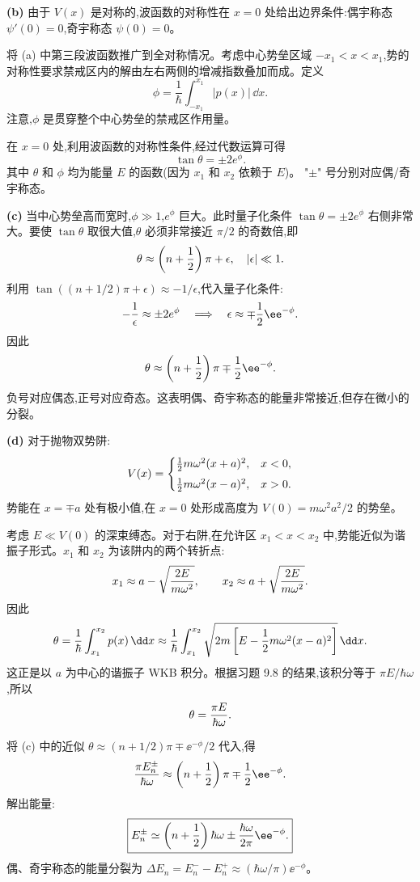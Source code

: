 \begin{question}
\begin{solution}
\textbf{(b)} 由于 $V(x)$ 是对称的,波函数的对称性在 $x=0$ 处给出边界条件:偶宇称态 $\psi'(0)=0$,奇宇称态 $\psi(0)=0$。

将 (a) 中第三段波函数推广到全对称情况。考虑中心势垒区域 $-x_1<x<x_1$,势的对称性要求禁戒区内的解由左右两侧的增减指数叠加而成。定义
\[
\phi=\frac{1}{\hbar}\int_{-x_1}^{x_1}|p(x)|\,\dd x.
\]
注意,$\phi$ 是贯穿整个中心势垒的禁戒区作用量。

在 $x=0$ 处,利用波函数的对称性条件,经过代数运算可得
\[
\boxed{\tan\theta=\pm2e^\phi.}
\]
其中 $\theta$ 和 $\phi$ 均为能量 $E$ 的函数(因为 $x_1$ 和 $x_2$ 依赖于 $E$)。 "$\pm$" 号分别对应偶/奇宇称态。

\textbf{(c)} 当中心势垒高而宽时,$\phi\gg1$,$e^\phi$ 巨大。此时量子化条件 $\tan\theta=\pm2e^\phi$ 右侧非常大。要使 $\tan\theta$ 取很大值,$\theta$ 必须非常接近 $\pi/2$ 的奇数倍,即
\[
\theta\approx\left(n+{1\over2}\right)\pi+\epsilon,\quad |\epsilon|\ll1.
\]
利用 $\tan\left((n+1/2)\pi+\epsilon\right)\approx-1/\epsilon$,代入量子化条件:
\[
-{1\over\epsilon}\approx\pm2e^\phi\quad\Longrightarrow\quad
\epsilon\approx\mp{1\over2}\ee^{-\phi}.
\]
因此
\[
\theta\approx\left(n+{1\over2}\right)\pi\mp{1\over2}\ee^{-\phi}.
\]
负号对应偶态,正号对应奇态。这表明偶、奇宇称态的能量非常接近,但存在微小的分裂。

\textbf{(d)} 对于抛物双势阱:
\[
V(x)=\begin{cases}
{1\over2}m\omega^2(x+a)^2, & x<0,\\[4pt]
{1\over2}m\omega^2(x-a)^2, & x>0.
\end{cases}
\]
势能在 $x=\mp a$ 处有极小值,在 $x=0$ 处形成高度为 $V(0)=m\omega^2a^2/2$ 的势垒。

考虑 $E\ll V(0)$ 的深束缚态。对于右阱,在允许区 $x_1<x<x_2$ 中,势能近似为谐振子形式。$x_1$ 和 $x_2$ 为该阱内的两个转折点:
\[
x_1\approx a-\sqrt{2E\over m\omega^2},\qquad
x_2\approx a+\sqrt{2E\over m\omega^2}.
\]
因此
\[
\theta={1\over\hbar}\int_{x_1}^{x_2}p(x)\,\dd x
\approx{1\over\hbar}\int_{x_1}^{x_2}\sqrt{2m\left[E-{1\over2}m\omega^2(x-a)^2\right]}\,\dd x.
\]
这正是以 $a$ 为中心的谐振子 WKB 积分。根据习题 9.8 的结果,该积分等于 $\pi E/\hbar\omega$,所以
\[
\theta={\pi E\over\hbar\omega}.
\]

将 (c) 中的近似 $\theta\approx(n+1/2)\pi\mp \ee^{-\phi}/2$ 代入,得
\[
{\pi E_n^\pm\over\hbar\omega}\approx\left(n+{1\over2}\right)\pi\mp{1\over2}\ee^{-\phi}.
\]
解出能量:
\[
\boxed{E_n^\pm\simeq\left(n+{1\over2}\right)\hbar\omega
\pm{\hbar\omega\over2\pi}\ee^{-\phi}.}
\]
偶、奇宇称态的能量分裂为 $\Delta E_n=E_n^--E_n^+\approx(\hbar\omega/\pi)\ee^{-\phi}$。


\end{solution}
\end{question}
